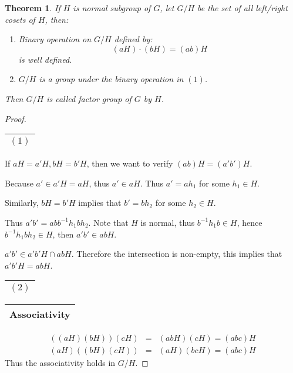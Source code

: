 \documentclass{article}
\theoremstyle{MyNonumberplain}
\theoremstyle{break}
\newtheorem*{proof}{Proof. }
\theoremstyle{break}
\newtheorem{theorem}{Theorem}[section]
\theoremstyle{break}
\theoremstyle{definition}
\theoremstyle{break}
\begin{document}
\begin{thmbox}
    \begin{theorem}
        If $H$ is normal subgroup of $G$, let $G / H$ be the set of all left/right
        cosets of $H$, then:\bigskip
        \begin{enumerate}
        \item Binary operation on $G / H$ defined by:
        \[ (a H) \cdot (b H) = (a b) H \]
        is well defined.\bigskip
        \item $G / H$ is a group under the binary operation in $(1)$.\bigskip
        \end{enumerate}
        Then $G / H$ is called factor group of $G$ by $H$.
    \end{theorem}
    \begin{prfbox}
        \begin{proof}
            \begin{tabular}{|c|}
                \hline
                $(1)$\\
                \hline
              \end{tabular}\bigskip
              
              If $a H = a' H, b H = b' H$, then we want to verify $(a b) H = (a' b') H$.\bigskip
              
              Because $a' \in a' H = a H$, thus $a' \in a H$. Thus $a' = a h_1$ for some
              $h_1 \in H$.\bigskip
              
              Similarly, $b H = b' H$ implies that $b' = b h_2$ for some $h_2 \in H$.\bigskip
              
              Thus $a' b' = a b b^{- 1} h_1 b h_2$. Note that $H$ is normal, thus $b^{- 1}
              h_1 b \in H$, hence $b^{- 1} h_1 b h_2 \in H$, then $a' b' \in a b H$.\bigskip
              
              $a' b' \in a' b' H \cap a b H$. Therefore the intersection is non-empty, this
              implies that $a' b' H = a b H$.\bigskip
              
              \begin{tabular}{|c|}
                \hline
                $(2)$\\
                \hline
              \end{tabular}\bigskip
              
              \begin{tabular}{|c|}
                \hline
                Associativity\\
                \hline
              \end{tabular}
              \begin{eqnarray*}
                ((a H) (b H)) (c H) & = & (a b H) (c H) = (a b c) H\\
                (a H) ((b H) (c H)) & = & (a H) (b c H) = (a b c) H
              \end{eqnarray*}
              Thus the associativity holds in $G / H$.\bigskip
              

\end{proof}
\end{prfbox}
\end{thmbox}
\end{document}
